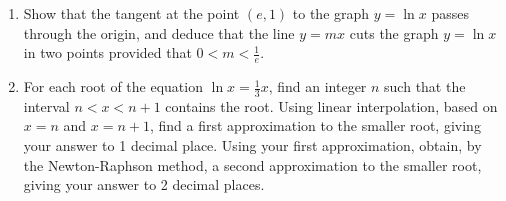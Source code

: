 \clearpage
\begin{problem}
    \begin{enumerate}
        \item Show that the tangent at the point $(e, 1)$ to the graph $y=\ln x$ passes through the origin, and deduce that the line $y=mx$ cuts the graph $y=\ln x$ in two points provided that $0 < m <  \frac1e$.
        \item For each root of the equation $\ln x = \frac13 x$, find an integer $n$ such that the interval $n < x < n+1$ contains the root. Using linear interpolation, based on $x=n$ and $x = n+1$, find a first approximation to the smaller root, giving your answer to 1 decimal place. Using your first approximation, obtain, by the Newton-Raphson method, a second approximation to the smaller root, giving your answer to 2 decimal places.
    \end{enumerate}
\end{problem}
